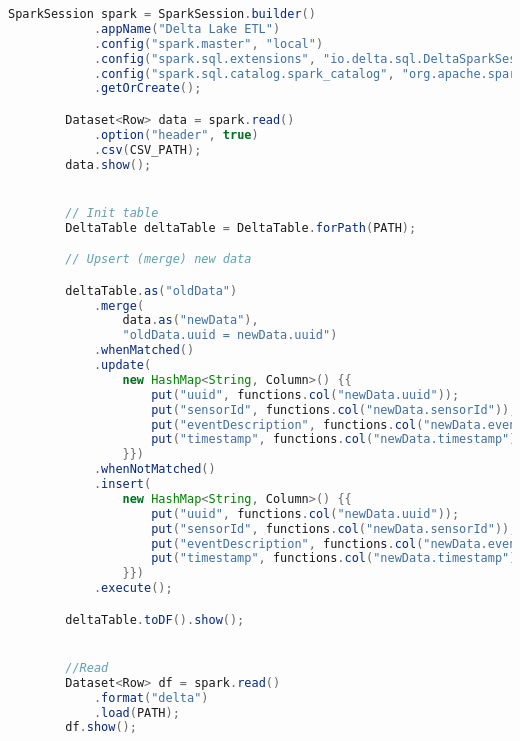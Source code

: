 \documentclass[%
bachelor,    %
subf,        %
href,        %
colorlinks,  %
]{disser}
\begin{document}
\newpage
\begin{lstlisting}[caption={Запись из CSV в Delta Lake таблицу},captionpos=b,label={lst:4},language=Java]	
        SparkSession spark = SparkSession.builder()
            .appName("Delta Lake ETL")
            .config("spark.master", "local")
            .config("spark.sql.extensions", "io.delta.sql.DeltaSparkSessionExtension")
            .config("spark.sql.catalog.spark_catalog", "org.apache.spark.sql.delta.catalog.DeltaCatalog")
            .getOrCreate();

        Dataset<Row> data = spark.read()
            .option("header", true)
            .csv(CSV_PATH);
        data.show();


        // Init table
        DeltaTable deltaTable = DeltaTable.forPath(PATH);

        // Upsert (merge) new data

        deltaTable.as("oldData")
            .merge(
                data.as("newData"),
                "oldData.uuid = newData.uuid")
            .whenMatched()
            .update(
                new HashMap<String, Column>() {{
                    put("uuid", functions.col("newData.uuid"));
                    put("sensorId", functions.col("newData.sensorId"));
                    put("eventDescription", functions.col("newData.eventDescription"));
                    put("timestamp", functions.col("newData.timestamp"));
                }})
            .whenNotMatched()
            .insert(
                new HashMap<String, Column>() {{
                    put("uuid", functions.col("newData.uuid"));
                    put("sensorId", functions.col("newData.sensorId"));
                    put("eventDescription", functions.col("newData.eventDescription"));
                    put("timestamp", functions.col("newData.timestamp"));
                }})
            .execute();

        deltaTable.toDF().show();


        //Read
        Dataset<Row> df = spark.read()
            .format("delta")
            .load(PATH);
        df.show();
\end{lstlisting}
\newpage
\end{document}
